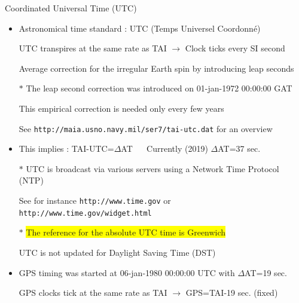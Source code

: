 \Tr
\begin{center}
{\red Coordinated Universal Time (UTC)}
\end{center}
%
\begin{itemize}
\item Astronomical time standard : {\blue UTC (Temps Universel Coordonn\'{e})}
\item[] UTC transpires at the same rate as TAI $\rightarrow$ Clock ticks every SI second
\item[] Average correction for the irregular Earth spin by introducing {\blue leap seconds}
\item[$\ast$] The leap second correction was introduced on 01-jan-1972 00:00:00 GAT
\item[] This empirical correction is needed only every few years
\item[] See {\tt http://maia.usno.navy.mil/ser7/tai-utc.dat} for an overview
\item This implies : {\blue TAI-UTC=$\Delta$AT} $\quad$ Currently (2019) $\Delta$AT=37 sec. 
\item[$\ast$] UTC is broadcast via various servers using a Network Time Protocol (NTP)
\item[] See for instance {\tt http://www.time.gov} or {\tt http://www.time.gov/widget.html}
\item[$\ast$] \colorbox{yellow}{The reference for the absolute UTC time is Greenwich}
\item[] UTC is not updated for Daylight Saving Time (DST)
\item GPS timing was started at 06-jan-1980 00:00:00 UTC with $\Delta$AT=19 sec.
\item[] GPS clocks tick at the same rate as TAI $\rightarrow$ {\blue GPS=TAI-19 sec.} (fixed)
\end{itemize}

